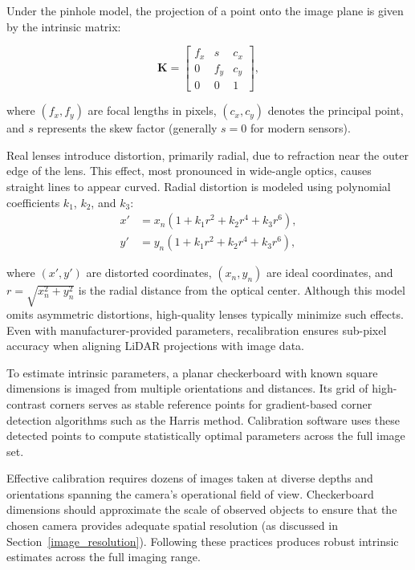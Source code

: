 \documentclass{erauthesis}
\begin{document}
Under the pinhole model, the projection of a point onto the image plane is given by the intrinsic matrix:

\begin{equation}
    \mathbf{K} = 
    \begin{bmatrix}
        f_x & s & c_x \\
        0 & f_y & c_y \\
        0 & 0 & 1
    \end{bmatrix},
\end{equation}

where $(f_x, f_y)$ are focal lengths in pixels, $(c_x, c_y)$ denotes the principal point, and $s$ represents the skew factor (generally $s=0$ for modern sensors).

Real lenses introduce distortion, primarily radial, due to refraction near the outer edge of the lens.  
This effect, most pronounced in wide-angle optics, causes straight lines to appear curved.  
Radial distortion is modeled using polynomial coefficients $k_1$, $k_2$, and $k_3$:
\begin{equation}
    \begin{split}
        x' &= x_n(1 + k_1 r^2 + k_2 r^4 + k_3 r^6), \\
        y' &= y_n(1 + k_1 r^2 + k_2 r^4 + k_3 r^6),
    \end{split}
\end{equation}

where $(x', y')$ are distorted coordinates, $(x_n, y_n)$ are ideal coordinates, and $r = \sqrt{x_n^2 + y_n^2}$ is the radial distance from the optical center.  
Although this model omits asymmetric distortions, high-quality lenses typically minimize such effects.  
Even with manufacturer-provided parameters, recalibration ensures sub-pixel accuracy when aligning \ac{LiDAR} projections with image data.

To estimate intrinsic parameters, a planar checkerboard with known square dimensions is imaged from multiple orientations and distances.  
Its grid of high-contrast corners serves as stable reference points for gradient-based corner detection algorithms such as the Harris method.  
Calibration software uses these detected points to compute statistically optimal parameters across the full image set.

Effective calibration requires dozens of images taken at diverse depths and orientations spanning the camera’s operational field of view.  
Checkerboard dimensions should approximate the scale of observed objects to ensure that the chosen camera provides adequate spatial resolution (as discussed in Section~\ref{image_resolution}).  
Following these practices produces robust intrinsic estimates across the full imaging range.
\end{document}
